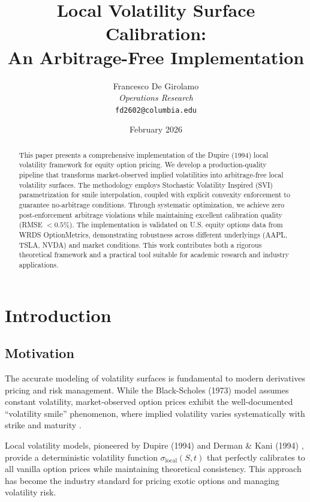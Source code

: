 \documentclass[12pt,a4paper]{article}
\title{\textbf{Local Volatility Surface Calibration:\\
An Arbitrage-Free Implementation}}
\author{Francesco De Girolamo\\
\textit{ Operations Research}\\
\texttt{fd2602@columbia.edu}}
\date{February 2026}
\begin{document}
\maketitle

\begin{abstract}
This paper presents a comprehensive implementation of the Dupire (1994) local volatility framework for equity option pricing. We develop a production-quality pipeline that transforms market-observed implied volatilities into arbitrage-free local volatility surfaces. The methodology employs Stochastic Volatility Inspired (SVI) parametrization for smile interpolation, coupled with explicit convexity enforcement to guarantee no-arbitrage conditions. Through systematic optimization, we achieve zero post-enforcement arbitrage violations while maintaining excellent calibration quality (RMSE $< 0.5\%$). The implementation is validated on U.S. equity options data from WRDS OptionMetrics, demonstrating robustness across different underlyings (AAPL, TSLA, NVDA) and market conditions. This work contributes both a rigorous theoretical framework and a practical tool suitable for academic research and industry applications.
\end{abstract}

\tableofcontents
\newpage

\section{Introduction}

\subsection{Motivation}

The accurate modeling of volatility surfaces is fundamental to modern derivatives pricing and risk management. While the Black-Scholes (1973) model assumes constant volatility, market-observed option prices exhibit the well-documented ``volatility smile'' phenomenon, where implied volatility varies systematically with strike and maturity \cite{Rubinstein1994}.

Local volatility models, pioneered by Dupire (1994) \cite{Dupire1994} and Derman \& Kani (1994) \cite{DermanKani1994}, provide a deterministic volatility function $\sigma_{\text{local}}(S,t)$ that perfectly calibrates to all vanilla option prices while maintaining theoretical consistency. This approach has become the industry standard for pricing exotic options and managing volatility risk.
\end{document}
